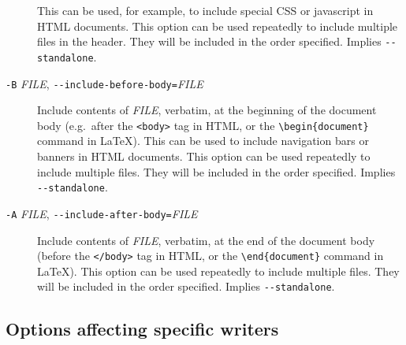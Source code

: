 \documentclass[]{article}
\begin{document}
\begin{description}
This can be used, for example, to include special CSS or javascript in
HTML documents. This option can be used repeatedly to include multiple
files in the header. They will be included in the order specified.
Implies \texttt{-\/-standalone}.
\item[\texttt{-B} \emph{FILE},
\texttt{-\/-include-before-body=}\emph{FILE}]
Include contents of \emph{FILE}, verbatim, at the beginning of the
document body (e.g.~after the \texttt{\textless{}body\textgreater{}} tag
in HTML, or the \texttt{\textbackslash{}begin\{document\}} command in
LaTeX). This can be used to include navigation bars or banners in HTML
documents. This option can be used repeatedly to include multiple files.
They will be included in the order specified. Implies
\texttt{-\/-standalone}.
\item[\texttt{-A} \emph{FILE},
\texttt{-\/-include-after-body=}\emph{FILE}]
Include contents of \emph{FILE}, verbatim, at the end of the document
body (before the \texttt{\textless{}/body\textgreater{}} tag in HTML, or
the \texttt{\textbackslash{}end\{document\}} command in LaTeX). This
option can be used repeatedly to include multiple files. They will be
included in the order specified. Implies \texttt{-\/-standalone}.
\end{description}

\subsection{Options affecting specific
writers}\label{options-affecting-specific-writers}
\end{document}
